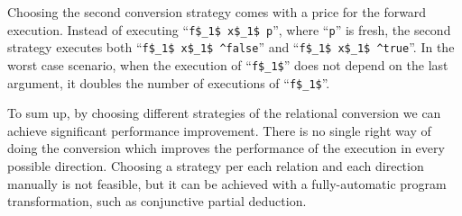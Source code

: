 Choosing the second conversion strategy comes with a price for the forward execution. 
Instead of executing ``\lstinline{f$_1$ x$_1$ p}'', where ``\lstinline{p}'' is fresh, the second strategy executes both ``\lstinline{f$_1$ x$_1$ ^false}'' and ``\lstinline{f$_1$ x$_1$ ^true}''.
In the worst case scenario, when the execution of ``\lstinline{f$_1$}'' does not depend on the last argument, it doubles the number of executions of ``\lstinline{f$_1$}''.

To sum up, by choosing different strategies of the relational conversion we can achieve significant performance improvement. 
There is no single right way of doing the conversion which improves the performance of the execution in every possible direction. 
Choosing a strategy per each relation and each direction manually is not feasible, but it can be achieved with a fully-automatic program transformation, such as conjunctive partial deduction.
